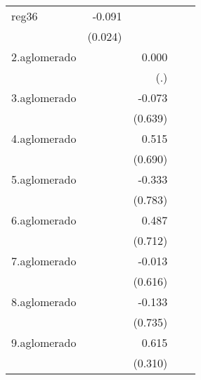 {\begin{longtable}{l*{4}{D{.}{.}{-1}}}
\addlinespace
reg36       &      -0.091\sym{***}&                     &                     &                     \\
            &     (0.024)         &                     &                     &                     \\
\addlinespace
2.aglomerado&                     &       0.000         &                     &                     \\
            &                     &         (.)         &                     &                     \\
\addlinespace
3.aglomerado&                     &      -0.073         &                     &                     \\
            &                     &     (0.639)         &                     &                     \\
\addlinespace
4.aglomerado&                     &       0.515         &                     &                     \\
            &                     &     (0.690)         &                     &                     \\
\addlinespace
5.aglomerado&                     &      -0.333         &                     &                     \\
            &                     &     (0.783)         &                     &                     \\
\addlinespace
6.aglomerado&                     &       0.487         &                     &                     \\
            &                     &     (0.712)         &                     &                     \\
\addlinespace
7.aglomerado&                     &      -0.013         &                     &                     \\
            &                     &     (0.616)         &                     &                     \\
\addlinespace
8.aglomerado&                     &      -0.133         &                     &                     \\
            &                     &     (0.735)         &                     &                     \\
\addlinespace
9.aglomerado&                     &       0.615\sym{*}  &                     &                     \\
            &                     &     (0.310)         &                     &                     \\

\end{longtable}}
